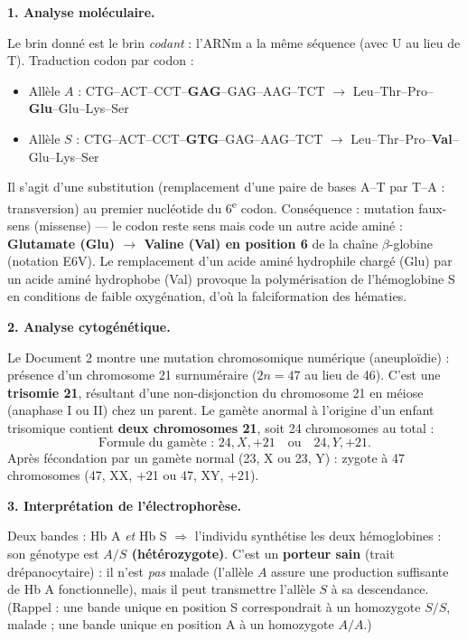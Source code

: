 \documentclass[11pt]{article}
\newcommand{\cle}[1]{{\popxbold\color{popdark}#1}}
\begin{document}
\begin{corrige}
\textbf{1. Analyse moléculaire.}

Le brin donné est le brin \emph{codant} : l'ARNm a la même séquence (avec U au lieu de T). Traduction codon par codon :
\begin{itemize}
    \item Allèle $A$ : CTG–ACT–CCT–\textbf{GAG}–GAG–AAG–TCT $\rightarrow$ Leu–Thr–Pro–\textbf{Glu}–Glu–Lys–Ser
    \item Allèle $S$ : CTG–ACT–CCT–\textbf{GTG}–GAG–AAG–TCT $\rightarrow$ Leu–Thr–Pro–\textbf{Val}–Glu–Lys–Ser
\end{itemize}
Il s'agit d'une \cle{substitution} (remplacement d'une paire de bases A–T par T–A : transversion) au premier nucléotide du 6\textsuperscript{e} codon. Conséquence : mutation \cle{faux-sens} (missense) — le codon reste sens mais code un autre acide aminé : \textbf{Glutamate (Glu) $\rightarrow$ Valine (Val) en position 6} de la chaîne $\beta$-globine (notation E6V). Le remplacement d'un acide aminé hydrophile chargé (Glu) par un acide aminé hydrophobe (Val) provoque la polymérisation de l'hémoglobine S en conditions de faible oxygénation, d'où la falciformation des hématies.

\textbf{2. Analyse cytogénétique.}

Le Document 2 montre une \cle{mutation chromosomique numérique} (aneuploïdie) : présence d'un chromosome 21 surnuméraire ($2n = 47$ au lieu de 46). C'est une \textbf{trisomie 21}, résultant d'une non-disjonction du chromosome 21 en méiose (anaphase I ou II) chez un parent. Le gamète anormal à l'origine d'un enfant trisomique contient \textbf{deux chromosomes 21}, soit 24 chromosomes au total :
\[ \text{Formule du gamète : } 24, X, +21 \quad \text{ou} \quad 24, Y, +21. \]
Après fécondation par un gamète normal (23, X ou 23, Y) : zygote à 47 chromosomes (47, XX, +21 ou 47, XY, +21).

\textbf{3. Interprétation de l'électrophorèse.}

Deux bandes : Hb A \emph{et} Hb S $\Rightarrow$ l'individu synthétise les deux hémoglobines : son génotype est \textbf{$A/S$ (hétérozygote)}. C'est un \textbf{porteur sain} (trait drépanocytaire) : il n'est \emph{pas} malade (l'allèle $A$ assure une production suffisante de Hb A fonctionnelle), mais il peut transmettre l'allèle $S$ à sa descendance. (Rappel : une bande unique en position S correspondrait à un homozygote $S/S$, malade ; une bande unique en position A à un homozygote $A/A$.)


\end{corrige}
\end{document}
